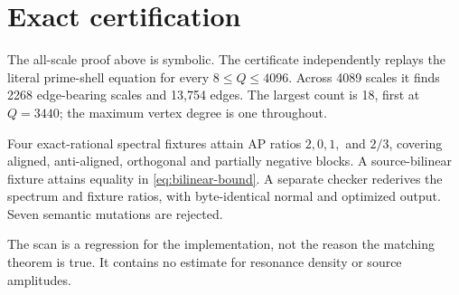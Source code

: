 \section{Exact certification}

The all-scale proof above is symbolic.  The certificate independently replays the
literal prime-shell equation for every $8\le Q\le4096$.  Across 4089 scales it finds
2268 edge-bearing scales and 13,754 edges.  The largest count is 18, first at $Q=3440$;
the maximum vertex degree is one throughout.

Four exact-rational spectral fixtures attain AP ratios $2,0,1,$ and $2/3$, covering
aligned, anti-aligned, orthogonal and partially negative blocks.  A source-bilinear
fixture attains equality in \eqref{eq:bilinear-bound}.  A separate checker rederives the
spectrum and fixture ratios, with byte-identical normal and optimized output.  Seven
semantic mutations are rejected.

The scan is a regression for the implementation, not the reason the matching theorem is
true.  It contains no estimate for resonance density or source amplitudes.
